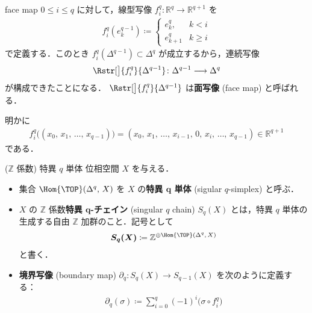 \documentclass[algtopo_main]{subfiles}
\begin{document}
\begin{mydef}[label=def:facemap, breakable]{face map}
    $0 \le i \le q$ に対して，線型写像 $f_i^{q} \colon \mathbb{R}^q \to \mathbb{R}^{q+1}$ を
    \begin{align}
        f_i^{q} (e_k^{q-1}) \coloneqq 
        \begin{cases}
            e_k^q, &k<i \\
            e_{k+1}^q &k \ge i
        \end{cases}
    \end{align}
    で定義する．このとき $f_i^{q}(\Delta^{q-1}) \subset \Delta^q$ が成立するから，連続写像
    \begin{align}
        \Rstr[\big]{f_i^{q}}{\Delta^{q-1}} \colon \Delta^{q-1} \longrightarrow \Delta^q
    \end{align}
    が構成できたことになる．
    $\Rstr[\big]{f_i^{q}}{\Delta^{q-1}}$ は\textbf{面写像} (face map) と呼ばれる．
\end{mydef}
明かに
\begin{align}
    f_i^{q}\bigl( (x_0,\, x_1,\, \dots,\, x_{q-1}) \bigr) = (x_0,\, x_1,\, \dots,\, x_{i-1},\, 0,\, x_{i},\, \dots,\, x_{q-1}) \in \mathbb{R}^{q+1}
\end{align}
である．

\begin{mydef}[label=def:singularsimplex, breakable]{($\mathbb{Z}$ 係数) 特異 $q$ 単体}
    位相空間 $X$ を与える．
    \begin{itemize}
        \item 集合 $\Hom{\TOP}(\Delta^q,\, X)$ を $X$ の\textbf{特異 $\bm{q}$ 単体} (sigular $q$-simplex) と呼ぶ．
        \item $X$ の $\mathbb{Z}$ 係数\textbf{特異 $\bm{q}$-チェイン} (singular $q$ chain) $S_q(X)$ とは，特異 $q$ 単体の生成する自由 $\mathbb{Z}$ 加群のこと．記号として
        \begin{align}
            \bm{S_q(X)} \coloneqq \mathbb{Z}^{\oplus \Hom{\TOP}(\Delta^q,\, X)}
        \end{align}
        と書く．
        \item \textbf{境界写像} (boundary map)
        $\partial_q \colon S_q(X) \longrightarrow S_{q-1}(X)$
        を次のように定義する：
        \begin{align}
            \partial_q(\sigma) \coloneqq \sum_{i=0}^q (-1)^i \bigl( \sigma \circ f^q_i \bigr) 
        \end{align}
    \end{itemize}
\end{mydef}
\end{document}
